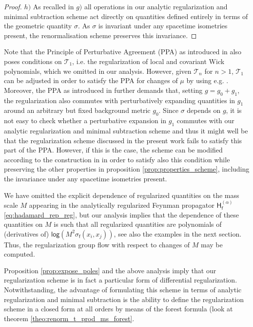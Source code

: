 \documentclass[11pt]{book}
\renewcommand{\log}{\mathsf{log}}
\newcommand{\Tcal}{\mathcal{T}}
\newcommand{\Hsf}{\mathsf{H}}
\newcommand{\fsf}{\mathsf{f}}
\theoremstyle{break}
\begin{document}
\begin{proof}
$h)$ As recalled in $g)$ all operations in our analytic regularization and minimal subtraction scheme act directly on quantities defined entirely in terms of the geometric quantity $\sigma$. As $\sigma$ is invariant under any spacetime isometries present, the renormalisation scheme preserves this invariance.





\end{proof}


\bigskip


Note that the Principle of Perturbative Agreement (PPA) as introduced in %
also poses conditions on $\Tcal_1$, i.e. the regularization of local and covariant Wick polynomials, which we omitted in our analysis. However, given $\Tcal_n$ for $n>1$, $\Tcal_1$ can be adjusted in order to satisfy the PPA for changes of $\mu$ by using e.g. %
. Moreover, the PPA as introduced in %
further demands that, setting $g = g_0 + g_1$, the regularization also commutes with perturbatively expanding quantities in $g_1$ around an arbitrary but fixed background metric $g_0$. Since $\sigma$ depends on $g$, it is not easy to check whether a perturbative expansion in $g_1$ commutes with our analytic regularization and minimal subtraction scheme and thus it might well be that the regularization scheme discussed in the present work fails to satisfy this part of the PPA. However, if this is the case, 
the scheme can be modified according to the construction in \cite{hollands_conservation_2005}
in order to satisfy also this condition while preserving the other properties in proposition \ref{prop:properties_scheme}, including the invariance under any spacetime isometries present.


\bigskip


We have omitted the explicit dependence of regularized quantities on the mass scale $M$ appearing in the analytically regularized Feynman propagator $\Hsf^{(\alpha)}_\fsf$ \eqref{eq:hadamard_rep_reg}, but our analysis implies that the dependence of these quantities on $M$ is such that all regularized quantities are polynomials of (derivatives of) $\log\left( M^2 \sigma_\fsf(x_i,x_j)\right)$, see also the examples in the next section. Thus, the regularization group flow with respect to changes of $M$ may be computed.

\bigskip

Proposition \ref{prop:expose_poles} and the above analysis imply that our regularization scheme is in fact a particular form of differential regularization. Notwithstanding, the advantage of formulating this scheme in terms of analytic regularization and minimal subtraction is the ability to define the regularization scheme in a closed form at all orders by means of the forest formula (look at theorem \ref{theo:renorm_t_prod_ms_forest}.
\end{document}
